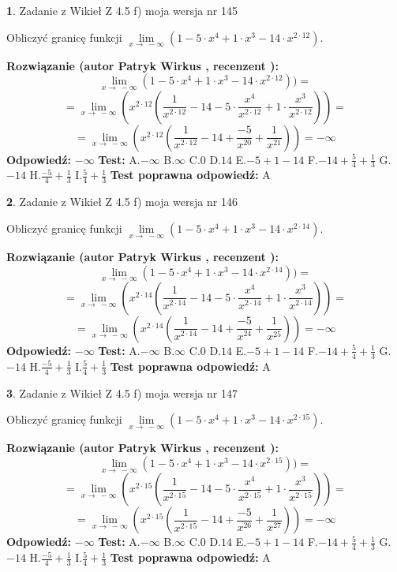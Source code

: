 \documentclass[12pt, a4paper]{article}
\theoremstyle{definition} %
\newtheorem{zad}{}
\newcommand{\zadStart}[1]{\begin{zad}#1\newline}
\newcommand{\zadStop}{\end{zad}}
\newcommand{\rozwStart}[2]{\noindent \textbf{Rozwiązanie (autor #1 , recenzent #2): }\newline}
\newcommand{\rozwStop}{\newline}
\newcommand{\odpStart}{\noindent \textbf{Odpowiedź:}\newline}
\newcommand{\odpStop}{\newline}
\newcommand{\testStart}{\noindent \textbf{Test:}\newline}
\newcommand{\testStop}{\newline}
\newcommand{\kluczStart}{\noindent \textbf{Test poprawna odpowiedź:}\newline}
\newcommand{\kluczStop}{\newline}
\begin{document}
\zadStart{Zadanie z Wikieł Z 4.5 f) moja wersja nr 145}



Obliczyć granicę funkcji  $\lim\limits_{x\to\ -\infty}(1 - 5 \cdot x^{4}+1 \cdot x^{3}- 14 \cdot x^{2\cdot12})$.
\zadStop
\rozwStart{Patryk Wirkus}{}
$$\lim\limits_{x\to\ -\infty}(1 - 5 \cdot x^{4}+1 \cdot x^{3}- 14 \cdot x^{2\cdot12}))=$$
$$=\lim\limits_{x\to\ -\infty}(x^{2\cdot12}(\frac{1}{x^{2\cdot12}}-14 -5 \cdot \frac{x^{4}}{x^{2\cdot12}}+1 \cdot \frac{x^{3}}{x^{2\cdot12}}))=$$
$$=\lim\limits_{x\to\ -\infty}(x^{2\cdot12}(\frac{1}{x^{2\cdot12}}-14 + \frac{-5}{x^{20}}+ \frac{1}{x^{21}}))=-\infty$$
\rozwStop
\odpStart
$-\infty$
\odpStop
\testStart
A.$-\infty$ B.$\infty$ C.$0$ D.$14$ E.$-5 + 1 - 14$
F.$-14+\frac{5}{4}+\frac{1}{3}$ G.$-14$
H.$\frac{-5}{4}+\frac{1}{3}$
I.$\frac{5}{4}+\frac{1}{3}$
\testStop
\kluczStart
A
\kluczStop



\zadStart{Zadanie z Wikieł Z 4.5 f) moja wersja nr 146}



Obliczyć granicę funkcji  $\lim\limits_{x\to\ -\infty}(1 - 5 \cdot x^{4}+1 \cdot x^{3}- 14 \cdot x^{2\cdot14})$.
\zadStop
\rozwStart{Patryk Wirkus}{}
$$\lim\limits_{x\to\ -\infty}(1 - 5 \cdot x^{4}+1 \cdot x^{3}- 14 \cdot x^{2\cdot14}))=$$
$$=\lim\limits_{x\to\ -\infty}(x^{2\cdot14}(\frac{1}{x^{2\cdot14}}-14 -5 \cdot \frac{x^{4}}{x^{2\cdot14}}+1 \cdot \frac{x^{3}}{x^{2\cdot14}}))=$$
$$=\lim\limits_{x\to\ -\infty}(x^{2\cdot14}(\frac{1}{x^{2\cdot14}}-14 + \frac{-5}{x^{24}}+ \frac{1}{x^{25}}))=-\infty$$
\rozwStop
\odpStart
$-\infty$
\odpStop
\testStart
A.$-\infty$ B.$\infty$ C.$0$ D.$14$ E.$-5 + 1 - 14$
F.$-14+\frac{5}{4}+\frac{1}{3}$ G.$-14$
H.$\frac{-5}{4}+\frac{1}{3}$
I.$\frac{5}{4}+\frac{1}{3}$
\testStop
\kluczStart
A
\kluczStop



\zadStart{Zadanie z Wikieł Z 4.5 f) moja wersja nr 147}



Obliczyć granicę funkcji  $\lim\limits_{x\to\ -\infty}(1 - 5 \cdot x^{4}+1 \cdot x^{3}- 14 \cdot x^{2\cdot15})$.
\zadStop
\rozwStart{Patryk Wirkus}{}
$$\lim\limits_{x\to\ -\infty}(1 - 5 \cdot x^{4}+1 \cdot x^{3}- 14 \cdot x^{2\cdot15}))=$$
$$=\lim\limits_{x\to\ -\infty}(x^{2\cdot15}(\frac{1}{x^{2\cdot15}}-14 -5 \cdot \frac{x^{4}}{x^{2\cdot15}}+1 \cdot \frac{x^{3}}{x^{2\cdot15}}))=$$
$$=\lim\limits_{x\to\ -\infty}(x^{2\cdot15}(\frac{1}{x^{2\cdot15}}-14 + \frac{-5}{x^{26}}+ \frac{1}{x^{27}}))=-\infty$$
\rozwStop
\odpStart
$-\infty$
\odpStop
\testStart
A.$-\infty$ B.$\infty$ C.$0$ D.$14$ E.$-5 + 1 - 14$
F.$-14+\frac{5}{4}+\frac{1}{3}$ G.$-14$
H.$\frac{-5}{4}+\frac{1}{3}$
I.$\frac{5}{4}+\frac{1}{3}$
\testStop
\kluczStart
A
\kluczStop
\end{document}
